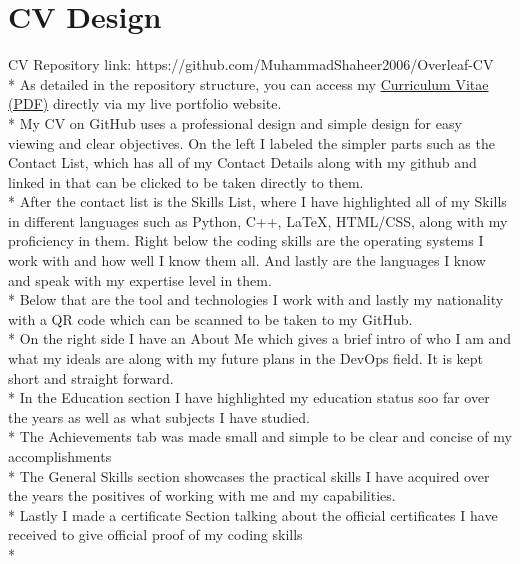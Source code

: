 \documentclass{turabian}
\begin{document}
\section{\large CV Design}
CV Repository link: https://github.com/MuhammadShaheer2006/Overleaf-CV\\*
As detailed in the repository structure, you can access my 
\href{https://muhammadshaheer2006.github.io/My-Portfolio.github.io/CV%20(1).pdf}{Curriculum Vitae (PDF)} 
directly via my live portfolio website.\\*
My CV on GitHub uses a professional design and simple design for easy viewing and clear objectives. On the left I labeled the simpler parts such as the Contact List, which has all of my Contact Details along with my github and linked in that can be clicked to be taken directly to them.\\*
After the contact list is the Skills List, where I have highlighted all of my Skills in different languages such as Python, C++, LaTeX, HTML/CSS, along with my proficiency in them. Right below the coding skills are the operating systems I work with and how well I know them all. And lastly are the languages I know and speak with my expertise level in them.\\*
Below that are the tool and technologies I work with and lastly my nationality with a QR code which can be scanned to be taken to my GitHub.\\*
On the right side I have an About Me which gives a brief intro of who I am and what my ideals are along with my future plans in the DevOps field. It is kept short and straight forward.\\*
In the Education section I have highlighted my education status soo far over the years as well as what subjects I have studied.\\*
The Achievements tab was made small and simple to be clear and concise of my accomplishments\\*
The General Skills section showcases the practical skills I have acquired over the years the positives of working with me and my capabilities.\\*
Lastly I made a certificate Section talking about the official certificates I have received to give official proof of my coding skills\\*
\end{document}
